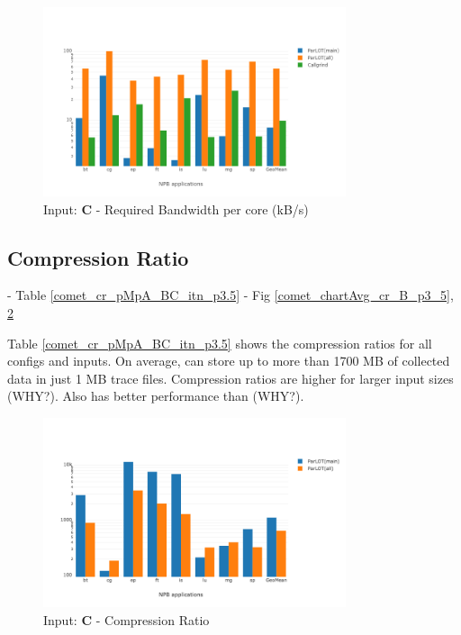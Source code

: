 \begin{figure}[!t]
\centering
\includegraphics[width=3.5in]{figs.comet/comet_chartAvg_bw_C_p3_5.png}
\caption{ Input: \textbf{C}  - Required Bandwidth per core (kB/s)
}
\label{comet_chartAvg_bw_C_p3_5}
\end{figure}


  
\subsection{Compression Ratio}
\label{subsec:cr}
 - Table \ref{comet_cr_pMpA_BC_itn_p3.5}
  - Fig \ref{comet_chartAvg_cr_B_p3_5}, \ref{comet_chartAvg_cr_C_p3_5}

  Table \ref{comet_cr_pMpA_BC_itn_p3.5} shows the compression ratios for all configs and inputs. On average, \parlot can store up to more than 1700 MB of collected data in just 1 MB trace files. Compression ratios are higher for larger input sizes (WHY?). Also \parlotm has better performance than \parlota (WHY?).
  




\begin{figure}[!t]
\centering
\includegraphics[width=3.5in]{figs.comet/comet_chartAvg_cr_C_p3_5.png}
\caption{ Input: \textbf{C}  - Compression Ratio
}
\label{comet_chartAvg_cr_C_p3_5}
\end{figure}


